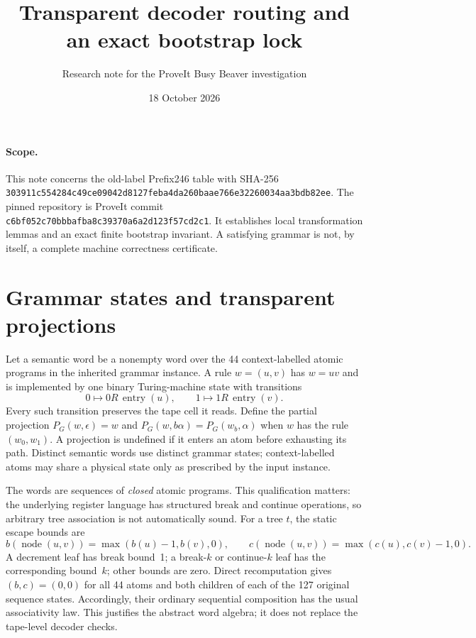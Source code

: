 \documentclass[11pt]{article}
\title{Transparent decoder routing and an exact bootstrap lock}
\author{Research note for the ProveIt Busy Beaver investigation}
\date{18 October 2026}
\begin{document}
\maketitle

\paragraph{Scope.}
This note concerns the old-label Prefix246 table with SHA-256
\texttt{303911c554284c49ce09042d8127feba4da260baae766e32260034aa3bdb82ee}.
The pinned repository is ProveIt commit
\texttt{c6bf052c70bbbafba8c39370a6a2d123f57cd2c1}.
It establishes local transformation lemmas and an exact finite bootstrap
invariant. A satisfying grammar is not, by itself, a complete machine
correctness certificate.

\section{Grammar states and transparent projections}

Let a semantic word be a nonempty word over the 44 context-labelled atomic
programs in the inherited grammar instance. A rule $w=(u,v)$ has $w=uv$ and
is implemented by one binary Turing-machine state with transitions
\[
  0\mapsto 0R\,\operatorname{entry}(u),\qquad
  1\mapsto 1R\,\operatorname{entry}(v).
\]
Every such transition preserves the tape cell it reads. Define the partial
projection $P_G(w,\epsilon)=w$ and
$P_G(w,b\alpha)=P_G(w_b,\alpha)$ when $w$ has the rule
$(w_0,w_1)$. A projection is undefined if it enters an atom before exhausting
its path. Distinct semantic words use distinct grammar states; context-labelled
atoms may share a physical state only as prescribed by the input instance.

The words are sequences of \emph{closed} atomic programs. This qualification
matters: the underlying register language has structured break and continue
operations, so arbitrary tree association is not automatically sound. For a
tree $t$, the static escape bounds are
\[
 b(\operatorname{node}(u,v))=\max(b(u)-1,b(v),0),\qquad
 c(\operatorname{node}(u,v))=\max(c(u),c(v)-1,0).
\]
A decrement leaf has break bound~1; a break-$k$ or continue-$k$ leaf has the
corresponding bound~$k$; other bounds are zero. Direct recomputation gives
$(b,c)=(0,0)$ for all 44 atoms and both children of each of the 127 original
sequence states. Accordingly, their ordinary sequential composition has the
usual associativity law. This justifies the abstract word algebra; it does not
replace the tape-level decoder checks.
\end{document}
